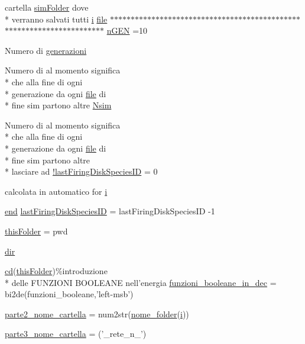 \begin{DoxyCompactItemize}
cartella \hyperlink{a00032_aa671e3345005bd599e662bcaa115b18a}{sim\+Folder} dove \\*
verranno salvati tutti \hyperlink{a00113_ad3efca1ea6e3333daf30719ee0501862}{i} \hyperlink{a00110_a4e8353d6c62cf54bf4a1a8f63e56b8c3}{file} $\ast$$\ast$$\ast$$\ast$$\ast$$\ast$$\ast$$\ast$$\ast$$\ast$$\ast$$\ast$$\ast$$\ast$$\ast$$\ast$$\ast$$\ast$$\ast$$\ast$$\ast$$\ast$$\ast$$\ast$$\ast$$\ast$$\ast$$\ast$$\ast$$\ast$$\ast$$\ast$$\ast$$\ast$$\ast$$\ast$$\ast$$\ast$$\ast$$\ast$$\ast$$\ast$$\ast$$\ast$$\ast$$\ast$$\ast$$\ast$$\ast$$\ast$$\ast$$\ast$$\ast$$\ast$$\ast$$\ast$$\ast$$\ast$$\ast$$\ast$$\ast$$\ast$$\ast$$\ast$$\ast$$\ast$$\ast$$\ast$$\ast$$\ast$ \hyperlink{a00113_a4c8fe523edbe179c5d215da13f469f72}{n\+G\+E\+N} =10
\item 
Numero di \hyperlink{a00113_a5951b3462407a0e7e2e60534f76f5fec}{generazioni}
\item 
Numero di al momento significa \\*
che alla fine di ogni \\*
generazione da ogni \hyperlink{a00110_a4e8353d6c62cf54bf4a1a8f63e56b8c3}{file} di \\*
fine sim partono altre \hyperlink{a00113_af882a6050e97fe1c6cc2bb391ea57479}{Nsim}
\item 
Numero di al momento significa \\*
che alla fine di ogni \\*
generazione da ogni \hyperlink{a00110_a4e8353d6c62cf54bf4a1a8f63e56b8c3}{file} di \\*
fine sim partono altre \\*
lasciare ad \hyperlink{a00113_aafb51343927e7262fbd66ce291fdbb87}{!last\+Firing\+Disk\+Species\+I\+D} = 0
\item 
calcolata in automatico for \hyperlink{a00113_ad3efca1ea6e3333daf30719ee0501862}{i}
\item 
\hyperlink{a00025_afb358f48b1646c750fb9da6c6585be2b}{end} \hyperlink{a00113_ac9358e0c7555a21532187de31cdbd469}{last\+Firing\+Disk\+Species\+I\+D} = last\+Firing\+Disk\+Species\+I\+D -\/1
\item 
\hyperlink{a00113_a2d4125646b62462ce279d82913125ccf}{this\+Folder} = pwd
\item 
\hyperlink{a00113_a4ca269cf93df1b512b52174c1a256fe5}{dir}
\item 
\hyperlink{a00113_abe327856a9ee2f30f3ccafe4dc9edf5e}{cd}(\hyperlink{a00113_a2d4125646b62462ce279d82913125ccf}{this\+Folder})\%introduzione \\*
delle F\+U\+N\+Z\+I\+O\+N\+I B\+O\+O\+L\+E\+A\+N\+E nell'energia \hyperlink{a00113_af44cf9f59bd0c10b4d2aa541bd7c156b}{funzioni\+\_\+booleane\+\_\+in\+\_\+dec} = bi2de(funzioni\+\_\+booleane,'left-\/msb')
\item 
\hyperlink{a00113_a18f9e9dff2c5a2fe455a8d41fa6860fa}{parte2\+\_\+nome\+\_\+cartella} = num2str(\hyperlink{a00113_a277bc625a7a558f74ccc1eb2963d70d0}{nome\+\_\+folder}(\hyperlink{a00113_ad3efca1ea6e3333daf30719ee0501862}{i}))
\item 
\hyperlink{a00113_a1795e2dc228962c5b67eaee336bba2ad}{parte3\+\_\+nome\+\_\+cartella} = ('\+\_\+rete\+\_\+n\+\_\+')
\end{DoxyCompactItemize}


